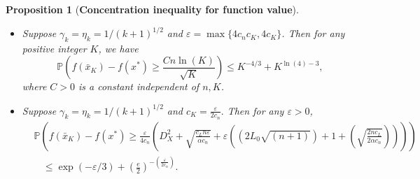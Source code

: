 \documentclass[11pt,reqno]{amsart}
\newcommand{\1}{{\bf 1}}
\newcommand{\2}{{\bf 2}}
\newcommand{\us}[1]{\textcolor{red}{#1}}
\newcommand{\al}{\alpha}
\numberwithin{equation}{section}
\newtheorem{proposition}{Proposition}[section]
\theoremstyle{remark}
\begin{document}
{\begin{proposition}[\bf{Concentration inequality for function value}]
\begin{itemize}
				where $c_n=\frac{4nL_0^2}{\pi}$, $c_L=8D_X^2L_0^2,$ $c_K=\sum_{k=0}^{K-1}\gamma_k^2$ and $c_{D,K,n} =D_X^2+\sum_{k=0}^{K-1}2L_0\sqrt{n+1}\gamma_k\eta_k+\sqrt{\frac{2nc_Lc_K}{\al}}$. 
				\item[(iii)] Suppose $\gamma_k=\eta_k=1/(k+1)^{1/2}$ and $\varepsilon=\max\{4c_nc_K,4c_K\}$. {Then for any positive integer $K$},  we have
				\begin{equation}\label{eq:concenfinal}
					\mathbb{P}\left(f(\bar{x}_K)-f(x^*)\geq\frac{Cn\ln(K)}{\sqrt{K}}\right)\leq K^{-4/3}+K^{\ln(4)-3},
				\end{equation}
				where $C>0$ is a constant independent of $n,K$.	
				\item[(iv)]
				Suppose {$\gamma_k=\eta_k=1/(k+1)^{1/2}$} and $c_K = \frac{\varepsilon}{2c_n}.$  Then for any $\varepsilon> 0$, 
				\begin{align*}
					& \mathbb{P}\left(f(\bar{x}_K)-f(x^*)\geq \frac{\varepsilon}{4c_n}\left(D_X^2 +\sqrt{\tfrac{c_Ln\varepsilon}{\al c_n}}+ \varepsilon\left(\left(2 L_0\sqrt{(n+1)}\right)+1+ \left(\sqrt{\tfrac{2nc_L}{2\al c_n}}\right)\right)\right)\right) \\
					&~~~~\le \exp\left(-\varepsilon/3\right)+\left(\frac{e}{2}\right)^{-(\frac{\varepsilon}{2c_n})}. 
				\end{align*}
			\end{itemize}
		\end{proposition}
		
}
\end{document}
